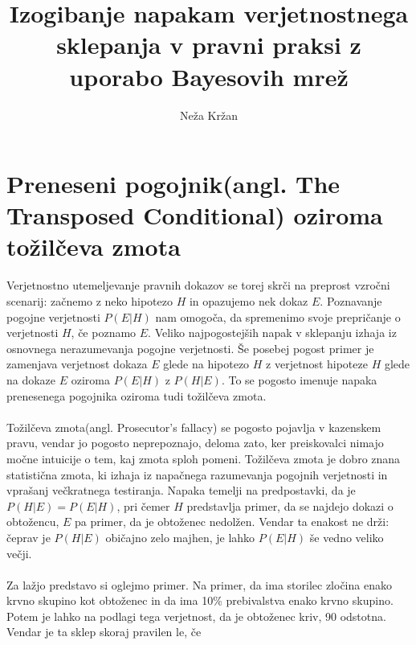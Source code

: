 \documentclass[12pt,a4paper]{amsart}
\theoremstyle{definition} %
\theoremstyle{plain} %
\begin{document}
\title{Izogibanje napakam verjetnostnega sklepanja v pravni praksi z uporabo Bayesovih mrež}
\author{Neža Kržan}
\maketitle

\section{Preneseni pogojnik(angl. The Transposed Conditional) oziroma tožilčeva zmota}
Verjetnostno utemeljevanje pravnih dokazov se torej skrči na preprost vzročni scenarij: začnemo z neko hipotezo $H$ in opazujemo nek dokaz $E$. 
Poznavanje pogojne verjetnosti $P(E \lvert H)$ nam omogoča, da spremenimo svoje prepričanje o verjetnosti $H$, če poznamo $E$. Veliko najpogostejših 
napak v sklepanju izhaja iz osnovnega nerazumevanja pogojne verjetnosti. Še posebej pogost primer je zamenjava verjetnost dokaza $E$ glede na 
hipotezo $H$ z verjetnost hipoteze $H$ glede na dokaze $E$ oziroma $P(E \lvert H)$ z $P(H \lvert E)$. To se pogosto imenuje napaka prenesenega pogojnika 
oziroma tudi tožilčeva zmota.\\\\
Tožilčeva zmota(angl. Prosecutor’s fallacy) se pogosto pojavlja v kazenskem pravu, vendar jo pogosto neprepoznajo, deloma zato, ker preiskovalci 
nimajo močne intuicije o tem, kaj zmota sploh pomeni. Tožilčeva zmota je dobro znana statistična zmota, ki izhaja iz napačnega razumevanja 
pogojnih verjetnosti in vprašanj večkratnega testiranja. Napaka temelji na predpostavki, da je $P(H \lvert E) = P(E \lvert H)$, pri čemer $H$ 
predstavlja primer, da se najdejo dokazi o obtožencu, $E$ pa primer, da je obtoženec nedolžen. Vendar ta enakost ne drži: čeprav je $P(H \lvert E)$ 
običajno zelo majhen, je lahko $P(E \lvert H)$ še vedno veliko večji. \\\\
Za lažjo predstavo si oglejmo primer. Na primer, da ima storilec zločina enako krvno skupino kot obtoženec in da ima 10\% prebivalstva 
enako krvno skupino. Potem je lahko na podlagi tega verjetnost, da je obtoženec kriv, 90 odstotna. Vendar je ta sklep skoraj pravilen le, če 
\end{document}

